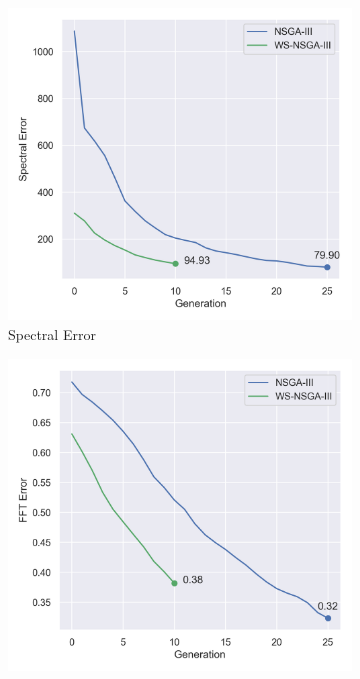 \begin{figure}[ht]
    \centering
    \begin{subfigure}[b]{0.32\textwidth}
        \centering
        \includegraphics[width=\textwidth]{figures/inverse-synth/wsnsga_plots/mean_spectral_error.png}
        \caption{Spectral Error}
    \end{subfigure}
    \begin{subfigure}[b]{0.32\textwidth}
        \centering
        \includegraphics[width=\textwidth]{figures/inverse-synth/wsnsga_plots/mean_fft_error.png}

\end{subfigure}
\end{figure}
